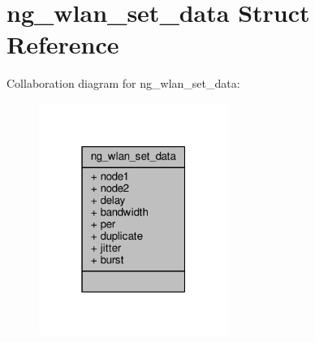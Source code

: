 \hypertarget{structng__wlan__set__data}{\section{ng\+\_\+wlan\+\_\+set\+\_\+data Struct Reference}
\label{structng__wlan__set__data}
}


Collaboration diagram for ng\+\_\+wlan\+\_\+set\+\_\+data\+:
\nopagebreak
\begin{figure}[H]
\begin{center}
\leavevmode
\includegraphics[width=175pt]{structng__wlan__set__data__coll__graph}
\end{center}
\end{figure}
